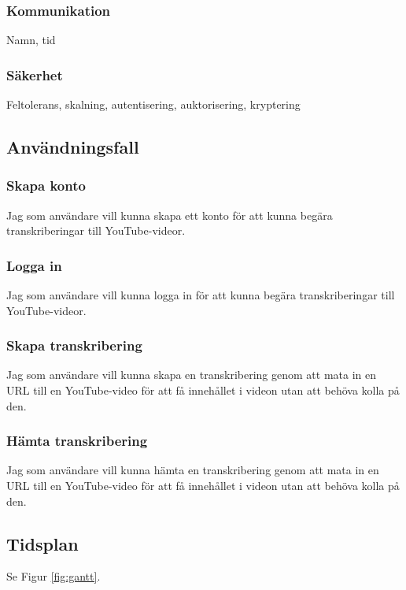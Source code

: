 \subsubsection{Kommunikation}
Namn, tid

\subsubsection{Säkerhet}
Feltolerans, skalning, autentisering, auktorisering, kryptering

\subsection{Användningsfall}

\subsubsection{Skapa konto}
Jag som användare vill kunna skapa ett konto för att kunna begära
transkriberingar till YouTube-videor.

\subsubsection{Logga in}
Jag som användare vill kunna logga in för att kunna begära transkriberingar
till YouTube-videor.

\subsubsection{Skapa transkribering}
Jag som användare vill kunna skapa en transkribering genom att mata in en URL
till en YouTube-video för att få innehållet i videon utan att behöva kolla på
den.

\subsubsection{Hämta transkribering}
Jag som användare vill kunna hämta en transkribering genom att mata in en URL
till en YouTube-video för att få innehållet i videon utan att behöva kolla på
den.

\subsection{Tidsplan}
Se Figur \ref{fig:gantt}.